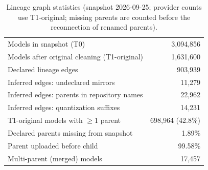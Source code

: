 \begin{table}[t]
\centering
\footnotesize
\caption{Lineage graph statistics (snapshot 2026-09-25; provider counts use T1-original; missing parents are counted before the reconnection of renamed parents).}
\label{tab:pilot}
\begin{tabular}{lr}
\toprule
Models in snapshot (T0) & 3,094,856 \\
Models after original cleaning (T1-original) & 1,631,600 \\
Declared lineage edges & 903,939 \\
Inferred edges: undeclared mirrors & 11,279 \\
Inferred edges: parents in repository names & 22,962 \\
Inferred edges: quantization suffixes & 14,231 \\
T1-original models with $\geq$1 parent & 698,964 (42.8\%) \\
Declared parents missing from snapshot & 1.89\% \\
Parent uploaded before child & 99.58\% \\
Multi-parent (merged) models & 17,457 \\
\bottomrule
\end{tabular}
\end{table}
